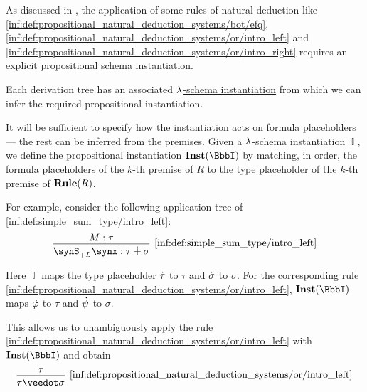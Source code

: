 \begin{algorithm}
\begin{thmenum}
     As discussed in , the application of some rules of natural deduction like \ref{inf:def:propositional_natural_deduction_systems/bot/efq}, \ref{inf:def:propositional_natural_deduction_systems/or/intro_left} and \ref{inf:def:propositional_natural_deduction_systems/or/intro_right} requires an explicit \hyperref[def:propositional_schema_instantiation]{propositional schema instantiation}.

    Each derivation tree has an associated \hyperref[def:lambda_schema_instantiation]{\( {\mathrm \lambda} \)-schema instantiation} from which we can infer the required propositional instantiation.

    It will be sufficient to specify how the instantiation acts on formula placeholders --- the rest can be inferred from the premises. Given a \( {\mathrm \lambda} \)-schema instantiation \( \BbbI \), we define the propositional instantiation \( \op*{Inst}(\BbbI) \) by matching, in order, the formula placeholders of the \( k \)-th premise of \( R \) to the type placeholder of the \( k \)-th premise of \( \op*{Rule}(R) \).

    For example, consider the following application tree of \ref{inf:def:simple_sum_type/intro_left}:
    \begin{equation*}
      \begin{prooftree}
        \hypo{ M: \tau }
        \infer1[\ref{inf:def:simple_sum_type/intro_left}]{ \synS_{+L} \synx: \tau \synplus \sigma }
      \end{prooftree}
    \end{equation*}

    Here \( \BbbI \) maps the type placeholder \( \dot{\tau} \) to \( \tau \) and \( \dot{\sigma} \) to \( \sigma \). For the corresponding rule \ref{inf:def:propositional_natural_deduction_systems/or/intro_left}, \( \op*{Inst}(\BbbI) \) maps \( \dot{\varphi} \) to \( \tau \) and \( \dot{\psi} \) to \( \sigma \).

    This allows us to unambiguously apply the rule \ref{inf:def:propositional_natural_deduction_systems/or/intro_left} with \( \op*{Inst}(\BbbI) \) and obtain
    \begin{equation*}
      \begin{prooftree}
        \hypo{ \tau }
        \infer1[\ref{inf:def:propositional_natural_deduction_systems/or/intro_left}]{ \tau \synvee \sigma }
      \end{prooftree}
    \end{equation*}


\end{thmenum}
\end{algorithm}
